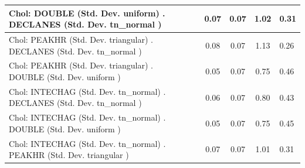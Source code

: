 \begin{table}
\begin{center}
\begin{tabular}{|l|l|c|c|c|l|}
			\hline
			 Chol: DOUBLE (Std. Dev. uniform) . DECLANES (Std. Dev.   tn_normal ) &  & 0.07 & 0.07 & 1.02 & 0.31 \\
			\hline
			 Chol: PEAKHR (Std. Dev. triangular) . DECLANES (Std. Dev.   tn_normal ) &  & 0.08 & 0.07 & 1.13 & 0.26 \\
			\hline
			 Chol: PEAKHR (Std. Dev. triangular) . DOUBLE (Std. Dev.   uniform ) &  & 0.05 & 0.07 & 0.75 & 0.46 \\
			\hline
			 Chol: INTECHAG (Std. Dev. tn_normal) . DECLANES (Std. Dev.   tn_normal ) &  & 0.06 & 0.07 & 0.80 & 0.43 \\
			\hline
			 Chol: INTECHAG (Std. Dev. tn_normal) . DOUBLE (Std. Dev.   uniform ) &  & 0.05 & 0.07 & 0.75 & 0.45 \\
			\hline
			 Chol: INTECHAG (Std. Dev. tn_normal) . PEAKHR (Std. Dev.   triangular ) &  & 0.07 & 0.07 & 1.01 & 0.31 \\
			\hline
		\end{tabular}
	\end{center}
\end{table}